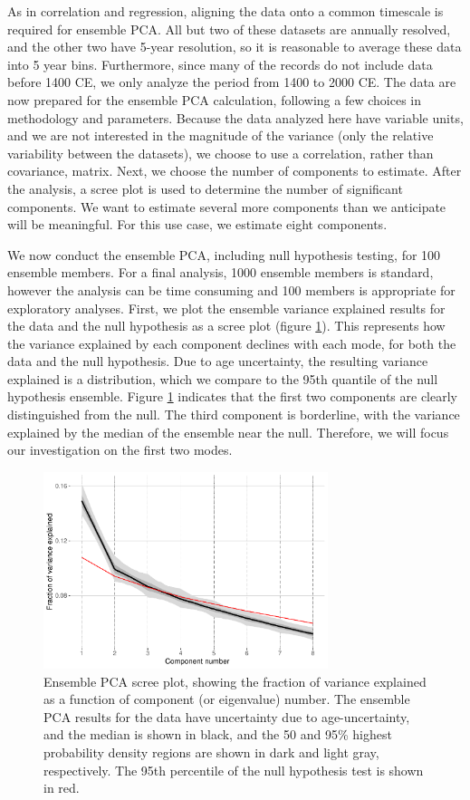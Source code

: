 \documentclass[gchron, manuscript]{copernicus}
\begin{document}
As in correlation and regression, aligning the data onto a common timescale is required for ensemble PCA. All but two of these datasets are annually resolved, and the other two have 5-year resolution, so it is reasonable to average these data into 5 year bins.
Furthermore, since many of the records do not include data before 1400 CE, we only analyze the period from 1400 to 2000 CE.
The data are now prepared for the ensemble PCA calculation, following a few choices in methodology and parameters.
Because the data analyzed here have variable units, and we are not interested in the magnitude of the variance (only the relative variability between the datasets), we choose to use a correlation, rather than covariance, matrix.
Next, we choose the number of components to estimate.
After the analysis, a scree plot is used to determine the number of significant components. We want to estimate several more components than we anticipate will be meaningful.
For this use case, we estimate eight components.

We now conduct the ensemble PCA, including null hypothesis testing, for 100 ensemble members.
For a final analysis, 1000 ensemble members is standard, however the analysis can be time consuming and 100 members is appropriate for exploratory analyses.
First, we plot the ensemble variance explained results for the data and the null hypothesis as a scree plot (figure \ref{fig:scree}).
This represents how the variance explained by each component declines with each mode, for both the data and the null hypothesis. Due to age uncertainty, the resulting variance explained is a distribution, which we compare to the 95th quantile of the null hypothesis ensemble.
Figure \ref{fig:scree} indicates that the first two components are clearly distinguished from the null.
The third component is borderline, with the variance explained by the median of the ensemble near the null.
Therefore, we will focus our investigation on the first two modes.

\begin{figure}
\includegraphics[width=8.3cm]{geoChronR-paper_files/figure-latex/scree-1} \caption{Ensemble PCA scree plot, showing the fraction of variance explained as a function of component (or eigenvalue) number. The ensemble PCA results for the data have uncertainty due to age-uncertainty, and the median is shown in black, and the 50 and 95\% highest probability density regions are shown in dark and light gray, respectively. The 95th percentile of the null hypothesis test is shown in red.}\label{fig:scree}
\end{figure}
\end{document}
